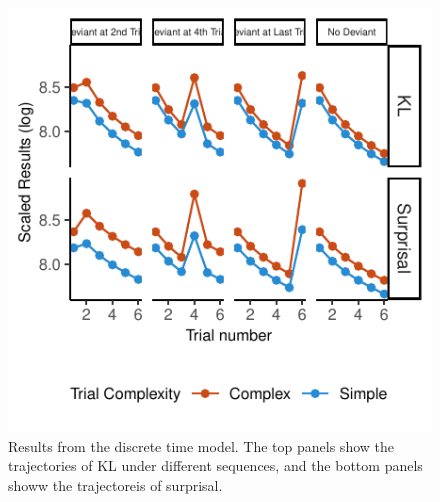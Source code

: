 \documentclass[10pt, letterpaper]{article}
\newenvironment{CodeChunk}{}{}
\begin{document}
\begin{CodeChunk}
\begin{figure}[h]

{\centering \includegraphics{figs/basic_result-1} 

}

\caption[Results from the discrete time model]{Results from the discrete time model. The top panels show the trajectories of KL under different sequences, and the bottom panels showw the trajectoreis of surprisal.}\label{fig:basic_result}
\end{figure}
\end{CodeChunk}
\end{document}
